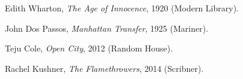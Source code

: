 \begin{description}

  \item Edith Wharton, \textit{The Age of Innocence}, 1920 (Modern Library).
  \item John Dos Passos, \textit{Manhattan Transfer}, 1925 (Mariner).
  \item Teju Cole, \textit{Open City}, 2012 (Random House).
  \item Rachel Kushner, \textit{The Flamethrowers}, 2014 (Scribner).

\end{description}
